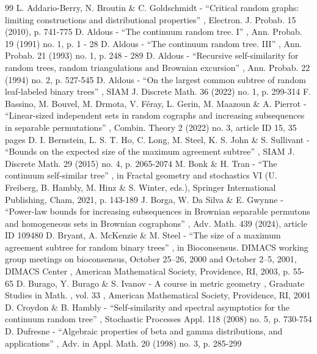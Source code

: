 \documentclass[11pt]{article}
\theoremstyle{plain}
\theoremstyle{definition}
\numberwithin{equation}{section}
\begin{document}
\begin{thebibliography}{99}
 L. Addario-Berry, N. Broutin \& C. Goldschmidt - “Critical random graphs: limiting constructions and distributional properties” , Electron. J. Probab. 15 (2010), p. 741-775
 D. Aldous - “The continuum random tree. I” , Ann. Probab. 19 (1991) no. 1, p. 1 - 28
 D. Aldous - “The continuum random tree. III” , Ann. Probab. 21 (1993) no. 1, p. 248 - 289
 D. Aldous - “Recursive self-similarity for random trees, random triangulations and Brownian excursion” , Ann. Probab. 22 (1994) no. 2, p. 527-545
 D. Aldous - “On the largest common subtree of random leaf-labeled binary trees” , SIAM J. Discrete Math. 36 (2022) no. 1, p. 299-314
 F. Bassino, M. Bouvel, M. Drmota, V. Féray, L. Gerin, M. Maazoun \& A. Pierrot - “Linear-sized independent sets in random cographs and increasing subsequences in separable permutations” , Combin. Theory 2 (2022) no. 3, article ID 15, 35 pages
 D. I. Bernstein, L. S. T. Ho, C. Long, M. Steel, K. S. John \& S. Sullivant - “Bounds on the expected size of the maximum agreement subtree” , SIAM J. Discrete Math. 29 (2015) no. 4, p. 2065-2074
 M. Bonk \& H. Tran - “The continuum self-similar tree” , in Fractal geometry and stochastics VI (U. Freiberg, B. Hambly, M. Hinz \& S. Winter, eds.), Springer International Publishing, Cham, 2021, p. 143-189
 J. Borga, W. Da Silva \& E. Gwynne - “Power-law bounds for increasing subsequences in Brownian separable permutons and homogeneous sets in Brownian cographons” , Adv. Math. 439 (2024), article ID 109480
 D. Bryant, A. McKenzie \& M. Steel - “The size of a maximum agreement subtree for random binary trees” , in Bioconsensus. DIMACS working group meetings on bioconsensus, October 25–26, 2000 and October 2–5, 2001, DIMACS Center , American Mathematical Society, Providence, RI, 2003, p. 55-65
 D. Burago, Y. Burago \& S. Ivanov - A course in metric geometry , Graduate Studies in Math. , vol. 33 , American Mathematical Society, Providence, RI, 2001
 D. Croydon \& B. Hambly - “Self-similarity and spectral asymptotics for the continuum random tree” , Stochastic Processes Appl. 118 (2008) no. 5, p. 730-754
 D. Dufresne - “Algebraic properties of beta and gamma distributions, and applications” , Adv. in Appl. Math. 20 (1998) no. 3, p. 285-299

\end{thebibliography}
\end{document}

